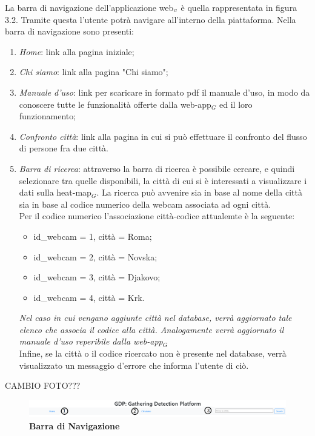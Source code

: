 La barra di navigazione dell'applicazione web$_{\scaleto{G}{3pt}}$ è quella rappresentata in figura 3.2. Tramite questa l'utente potrà navigare all'interno della piattaforma. Nella barra di navigazione sono presenti:
\begin{enumerate}
	\item \textit{Home}: link alla pagina iniziale;
	\item \textit{Chi siamo}: link alla pagina "Chi siamo";
	\item \textit{Manuale d'uso}: link per scaricare in formato pdf il manuale d'uso, in modo da conoscere tutte le funzionalità offerte dalla web-app$_G$ ed il loro funzionamento;
	\item \textit{Confronto città}: link alla pagina in cui si può effettuare il confronto del flusso di persone fra due città. 
	\item \textit{Barra di ricerca}: attraverso la barra di ricerca è possibile cercare, e quindi selezionare tra quelle disponibili, la città di cui si è interessati a visualizzare i dati sulla heat-map$_G$. La ricerca può avvenire sia in base al nome della città sia in base al codice numerico della webcam associata ad ogni città. \\ 
	Per il codice numerico l'associazione città-codice attualemte è la seguente:
	\begin{itemize}
		\item id{\_}webcam = 1, città = Roma;
		\item id{\_}webcam = 2, città = Novska;
		\item id{\_}webcam = 3, città = Djakovo;
		\item id{\_}webcam = 4, città = Krk.
	\end{itemize}
	\textit{Nel caso in cui vengano aggiunte città nel database, verrà aggiornato tale elenco che associa il codice alla città. Analogamente verrà aggiornato il manuale d'uso reperibile dalla web-app$_G$} \\
	Infine, se la città o il codice ricercato non è presente nel database, verrà visualizzato un messaggio d'errore che informa l'utente di ciò.
\end{enumerate}

CAMBIO FOTO???
\begin{center}
	\begin{figure}[H]
		\includegraphics[width=1\linewidth]{../immagini/manualeUtente/BarraDiNavigazioe.png}
		\caption{\textbf{Barra di Navigazione}}
	\end{figure}
\end{center}

